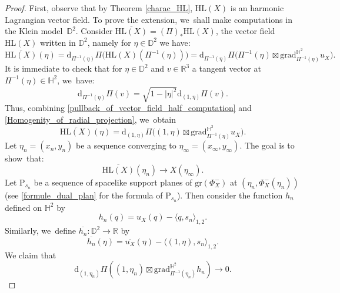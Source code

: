\documentclass[11pt]{article}
\theoremstyle{plain}
\theoremstyle{definition}
\newcommand{\grad}{\mathrm{grad}^{\mathbb{H}^2}}
\newcommand{\inner}[1] {\langle #1 \rangle}
\begin{document}
\begin{proof}
First, observe that by Theorem \ref{charac_HL}, $\mathrm{HL}(X)$ is an harmonic Lagrangian vector field. To prove the extension, we~shall make computations in the Klein model~$\mathbb{D}^2$. Consider $\overline{\mathrm{HL}(X)}=(\Pi)_*\mathrm{HL}(X)$, the vector field $\mathrm{HL}(X)$ written in $\mathbb{D}^2$, namely for $\eta\in\mathbb{D}^2$ we have:
\begin{equation}\label{pullback_of_vector_field_half_computation}
\overline{\mathrm{HL}(X)}(\eta)=\mathrm{d}_{\Pi^{-1}(\eta)}\Pi\bigl(\mathrm{HL}(X)(\Pi^{-1}(\eta)) \bigr)=\mathrm{d}_{\Pi^{-1}(\eta)}\Pi\bigl(\Pi^{-1}(\eta)\boxtimes\grad_{\Pi^{-1}(\eta)} u_X \bigr).
\end{equation}
It is immediate to check that for $\eta\in \mathbb{D}^2$ and $v\in \mathbb{R}^3$ a tangent vector at $\Pi^{-1}(\eta)\in \mathbb{H}^2$, we~have:
\begin{equation}\label{Homogenity_of_radial_projection}
\mathrm{d}_{\Pi^{-1}(\eta)}\Pi(v)=\sqrt{1-\lvert\eta\rvert^2}\mathrm{d}_{(1,\eta)}\Pi(v).
\end{equation}
Thus, combining \eqref{pullback_of_vector_field_half_computation} and \eqref{Homogenity_of_radial_projection}, we~obtain
\begin{equation}\label{pullback_of_vector_field}
\overline{\mathrm{HL}(X)}(\eta)=\mathrm{d}_{(1,\eta)}\Pi\bigl((1,\eta)\boxtimes\grad_{\Pi^{-1}(\eta)} u_X \bigr).
\end{equation}
Let $\eta_n\!=\!(x_n,y_n)$ be a sequence converging to $\eta_{\infty}\!=\!(x_{\infty},y_{\infty})$. The goal is to show~that:
\begin{equation}\label{goal}
\overline{\mathrm{HL}(X)}(\eta_n)\to X(\eta_{\infty}).
\end{equation}
Let $\mathrm{P}_{s_n}$ be a sequence of spacelike support planes of $\mathrm{gr}(\Phi_X^-)$ at $(\eta_n,\Phi_X^-(\eta_n))$ (see \eqref{formule_dual_plan} for the formula of $\mathrm{P}_{s_n}$). Then consider the function $h_n$ defined on $\mathbb{H}^2$ by
\[
h_n(q)=u_X(q)-\inner{q,s_n}_{1,2}.
\]
Similarly, we~define $\overline{h_n}:\mathbb{D}^2\to\mathbb{R}$ by \begin{equation}\label{eq_h_n_positive}
\overline{h_n}(\eta)=\overline{u_X}(\eta)-\inner{(1,\eta),s_n}_{1,2}.
\end{equation} We claim that
\begin{equation}\label{claiminextension}
\mathrm{d}_{(1,\eta_n)}\Pi\left((1,\eta_n)\boxtimes\grad_{\Pi^{-1}(\eta_n)} h_n \right)\to 0.
\end{equation}

\end{proof}
\end{document}
